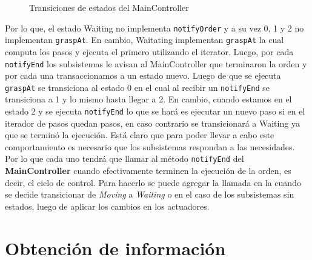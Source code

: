 \begin{figure}[h]
\label{statesMainController}
\caption{Transiciones de estados del MainController}
\begin{center}
\end{center}
\end{figure}

Por lo que, el estado Waiting no implementa \verb|notifyOrder| y a su vez 0, 1 y 2 no implementan \verb|graspAt|. En cambio, Waitating implementan \verb|graspAt| la cual computa los pasos y ejecuta el primero utilizando el iterator. Luego, por cada \verb|notifyEnd| los subsistemas le avisan al MainController que terminaron la orden y por cada una transaccionamos a un estado nuevo. Luego de que se ejecuta \verb|graspAt| se transiciona al estado 0 en el cual al recibir un \verb|notifyEnd| se transiciona a 1 y lo mismo hasta llegar a 2. En cambio, cuando estamos en el estado 2 y se ejecuta \verb|notifyEnd| lo que se hará es ejecutar un nuevo paso si en el iterador de pasos quedan pasos, en caso contrario se transicionará a Waiting ya que se terminó la ejecución. Está claro que para poder llevar a cabo este comportamiento es necesario que los subsistemas respondan a las necesidades. Por lo que cada uno tendrá que llamar al método \verb|notifyEnd| del \textbf{MainController} cuando efectivamente terminen la ejecución de la orden, es decir, el ciclo de control. Para hacerlo se puede agregar la llamada en la cuando se decide transicionar de \textit{Moving} a \textit{Waiting }o en el caso de los subsistemas sin estados, luego de aplicar los cambios en los actuadores.

\newpage
\section{Obtención de información}
\label{obtInfo}

